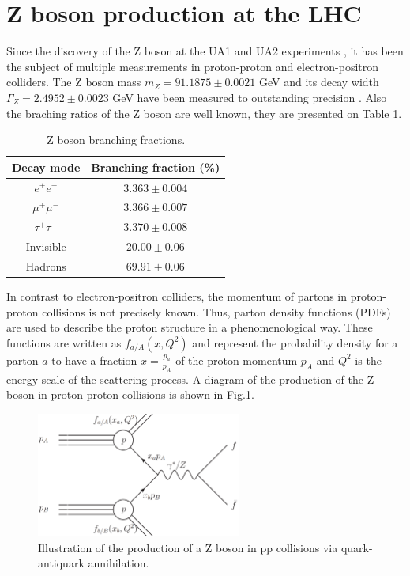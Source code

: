 \section{Z boson production at the LHC}\label{chap2sec0}
Since the discovery of the Z boson at the UA1 and UA2 experiments \cite{Arnison:1983rp,Arnison:1983mk,Banner:1983jy,Bagnaia:1983zx}, it has been the subject of multiple measurements in proton-proton and electron-positron colliders. The Z boson mass $m_Z=91.1875\pm0.0021$ GeV and its decay width $\Gamma_Z=2.4952\pm0.0023$ GeV have been measured to outstanding precision \cite{ALEPH:2005ab}. Also the braching ratios of the Z boson are well known, they are presented on Table \ref{Table0}.
\begin{table}[]
	\centering
	\begin{tabular}{cc}
		\hline
		\multicolumn{1}{|c|}{Decay mode} & \multicolumn{1}{c|}{Branching fraction (\%)} \\ \hline
		$e^+e^-$                         & $3.363\pm0.004$                              \\
		$\mu^+\mu^-$                     & $3.366\pm0.007$                              \\
		$\tau^+\tau^-$                   & $3.370\pm0.008$                              \\
		Invisible                        & $20.00\pm0.06$                               \\
		Hadrons                          & $69.91\pm0.06$                               \\ \hline
	\end{tabular}
	\caption{Z boson branching fractions.}
	\label{Table0}
\end{table}
In contrast to electron-positron colliders, the momentum of partons in proton-proton collisions is not precisely known. Thus, parton density functions (PDFs) are used to describe the proton structure in a phenomenological way. These functions are written as $f_{a/A}(x,Q^2)$ and represent the probability density for a parton $a$ to have a fraction $x=\frac{p_a}{p_A}$ of the proton momentum $p_A$ and $Q^2$ is the energy scale of the scattering process. A diagram of the production of the Z boson in proton-proton collisions is shown in Fig.\ref{Fig15}. 
\begin{figure}[h]
	\centering
	\includegraphics[width=0.6\textwidth]{figures/Fig15}
	\caption{Illustration of the production of a Z boson in pp collisions via quark-antiquark annihilation.}
	\label{Fig15}
\end{figure}
